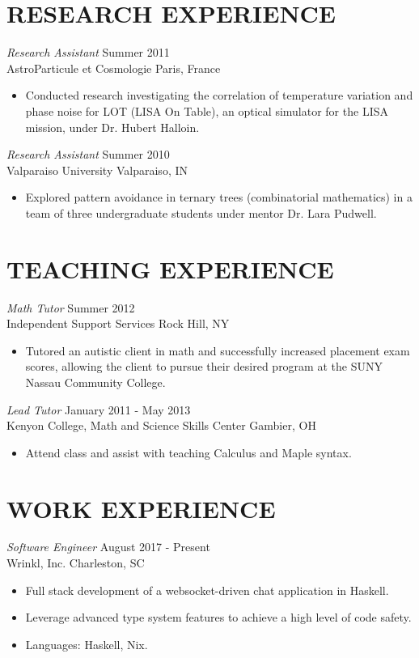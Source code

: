 \documentclass[margin]{res}
\begin{document}
\begin{resume}
\section{RESEARCH EXPERIENCE}
  {\sl Research Assistant} \hfill        Summer 2011 \\
  AstroParticule et Cosmologie \hfill Paris, France
  \begin{itemize}
    \item Conducted research investigating the correlation of temperature variation and
      phase noise for LOT (LISA On Table), an optical simulator for the LISA mission,
      under Dr. Hubert Halloin.
  \end{itemize}

  {\sl Research Assistant} \hfill        Summer 2010 \\
  Valparaiso University \hfill Valparaiso, IN
  \begin{itemize}
    \item Explored pattern avoidance in ternary trees (combinatorial mathematics) in a
      team of three undergraduate students under mentor Dr. Lara Pudwell.
  \end{itemize}

\section{TEACHING EXPERIENCE}
  {\sl Math Tutor} \hfill        Summer 2012 \\
  Independent Support Services \hfill Rock Hill, NY
  \begin{itemize}
    \item Tutored an autistic client in math and successfully increased placement exam
      scores, allowing the client to pursue their desired program at the SUNY Nassau
      Community College.
  \end{itemize}

  {\sl Lead Tutor} \hfill        January 2011 - May 2013 \\
  Kenyon College, Math and Science Skills Center \hfill Gambier, OH
  \begin{itemize}
    \item Attend class and assist with teaching Calculus and Maple syntax.
  \end{itemize}

\section{WORK EXPERIENCE}
  {\sl Software Engineer} \hfill August 2017 - Present \\
  Wrinkl, Inc. \hfill Charleston, SC
  \begin{itemize}  \itemsep -2pt %
    \item Full stack development of a websocket-driven chat application in Haskell.
    \item Leverage advanced type system features to achieve a high level of code safety.
    \item Languages: Haskell, Nix.
  \end{itemize}


\end{resume}
\end{document}
